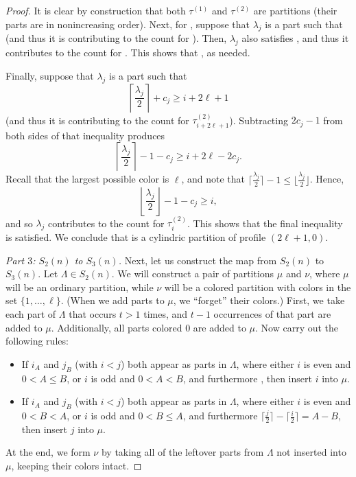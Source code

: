 \documentclass[pdftex]{sigma}
\numberwithin{equation}{section}
\theoremstyle{definition}
\begin{document}
\begin{proof}
It is clear by construction that both $\tau^{(1)}$ and $\tau^{(2)}$ are partitions (their parts are in nonincreasing order). Next, for , suppose that $\lambda_j$ is a part such that  (and thus it is contributing to the count for ). Then, $\lambda_j$ also satisfies , and thus it contributes to the count for . This shows that , as needed.

Finally, suppose that $\lambda_j$ is a part such that
\begin{equation*}
\left\lceil\frac {\lambda_j}2\right\rceil+c_j\ge i+2\ell+1
\end{equation*}
(and thus it is contributing to the count for $\tau^{(2)}_{i+2\ell+1}$). Subtracting $2c_j-1$ from both sides of that inequality produces
\begin{equation*}
\left\lceil\frac {\lambda_j}2\right\rceil-1-c_j\ge i+2\ell-2c_j.
\end{equation*}
Recall that the largest possible color is $\ell$, and note that $ \bigl\lceil\frac {\lambda_j}2\bigr\rceil-1\le\bigl\lfloor\frac {\lambda_j}2\bigr\rfloor$. Hence,
\begin{equation*}
\left\lfloor\frac {\lambda_j}2\right\rfloor-1-c_j\ge i,
\end{equation*}
and so $\lambda_j$ contributes to the count for $\tau^{(2)}_i$. This shows that the
final inequality  is satisfied. We conclude that  is a cylindric partition of profile $(2\ell+1,0)$.

{\it Part $3$: $S_2(n)$ to $S_3(n)$.} Next, let us construct the map from $S_2(n)$ to $S_3(n)$. Let $\Lambda \in S_2(n)$. We will construct a pair of partitions $\mu$ and $\nu$, where $\mu$ will be an ordinary partition, while $\nu$ will be a colored partition with colors in the set $\{1,\dots,\ell\}$. (When we add parts to $\mu$, we ``forget'' their colors.) First, we take each part of $\Lambda$ that occurs $t>1$ times, and $t-1$ occurrences of that part are added to $\mu$. Additionally, all parts colored 0 are added to $\mu$. Now carry out the following rules:
\begin{itemize}\itemsep=0pt
\item[$(R_1)$] If $i_{A}$ and $j_{B}$ (with $i<j$) both appear as parts in $\Lambda$, where either $i$ is even and $0<A \le B$, or $i$ is odd and $0 < A < B$, and furthermore
, then insert $i$ into $\mu$.
\item[$(R_2$)] If $i_{A}$ and $j_{B}$ (with $i<j$) both appear as parts in $\Lambda$, where either $i$ is even and $0<B< A$, or $i$ is odd and $0<B\le A$, and furthermore
$\bigl\lceil\frac j2\bigr\rceil-\bigl\lceil\frac i2\bigr\rceil=A-B$, then insert $j$ into $\mu$.
\end{itemize}
At the end, we form $\nu$ by taking all of the leftover parts from $\Lambda$ not inserted into $\mu$, keeping their colors intact.


\end{proof}
\end{document}
